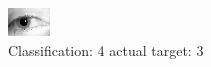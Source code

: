 \begin{figure}[h!]
\begin{center}
\includegraphics[width=0.60\columnwidth]{figures/ID1284_class_4_target_3.png}
\end{center}
\caption{ Classification: 4 actual target: 3}
\label{fig:ID1284_class_4_target_3}
\end{figure}
